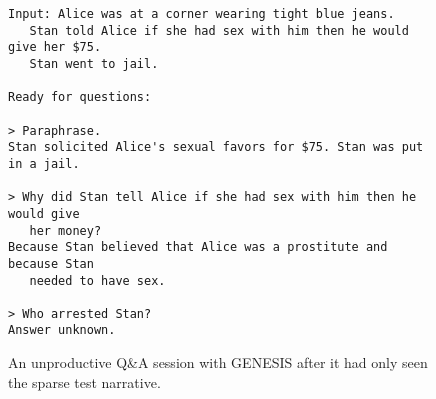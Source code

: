 \begin{figure}
    \begin{lstlisting}[frame=single]
Input: Alice was at a corner wearing tight blue jeans.
   Stan told Alice if she had sex with him then he would give her $75.
   Stan went to jail.
    
Ready for questions:

> Paraphrase.
Stan solicited Alice's sexual favors for $75. Stan was put in a jail.

> Why did Stan tell Alice if she had sex with him then he would give
   her money?
Because Stan believed that Alice was a prostitute and because Stan
   needed to have sex.

> Who arrested Stan?
Answer unknown.
    \end{lstlisting}
\caption{An unproductive Q\&A session with GENESIS after it had only seen the sparse test narrative.}
\label{fig:genesisqa1}
\end{figure}

